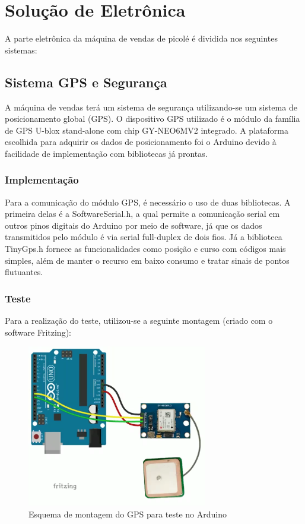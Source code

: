 \section{Solução de Eletrônica}

A parte eletrônica da máquina de vendas de picolé é dividida nos seguintes sistemas:

\subsection{Sistema GPS e Segurança}

A máquina de vendas terá um sistema de segurança utilizando-se um sistema de posicionamento global (GPS). O dispositivo GPS utilizado é o módulo da família de GPS U-blox stand-alone com chip GY-NEO6MV2 integrado. A plataforma escolhida para adquirir os dados de posicionamento foi o Arduino devido à facilidade de implementação com bibliotecas já prontas.

\subsubsection{Implementação}

Para a comunicação do módulo GPS, é necessário o uso de duas bibliotecas. A primeira delas é a SoftwareSerial.h, a qual permite a comunicação serial em outros pinos digitais do Arduino por meio de software, já que os dados transmitidos pelo módulo é via serial full-duplex de dois fios. Já a biblioteca TinyGps.h fornece as funcionalidades como posição e curso com códigos mais simples, além de manter o recurso em baixo consumo e tratar sinais de pontos flutuantes.

\newpage
\subsubsection{Teste}
Para a realização do teste, utilizou-se a seguinte montagem (criado com o software Fritzing):

\begin{figure}[H]
	\centering
    \includegraphics[width=0.7\textwidth]{figuras/fritzing_arduino}
    \caption{Esquema de montagem do GPS para teste no Arduino}
    \label{fig:fritzing_arduino}
\end{figure}

